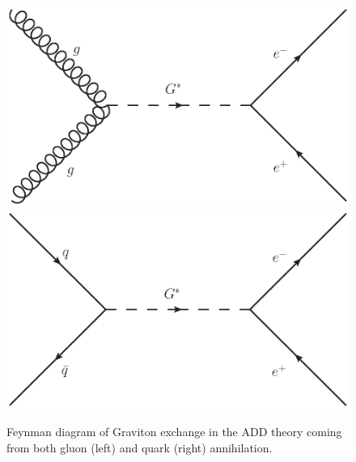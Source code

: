         \begin{figure}[h]
            \begin{center}
            \includegraphics[width=0.45\linewidth]{images/Gvirtual_gg_ee.eps}
            \includegraphics[width=0.45\linewidth]{images/Gvirtual_qq_ee.eps}
            \end{center}
            \caption{Feynman diagram of Graviton exchange in the ADD theory coming from both gluon (left) and quark (right) annihilation.}
            \label{fig:fdADD}
        \end{figure}

